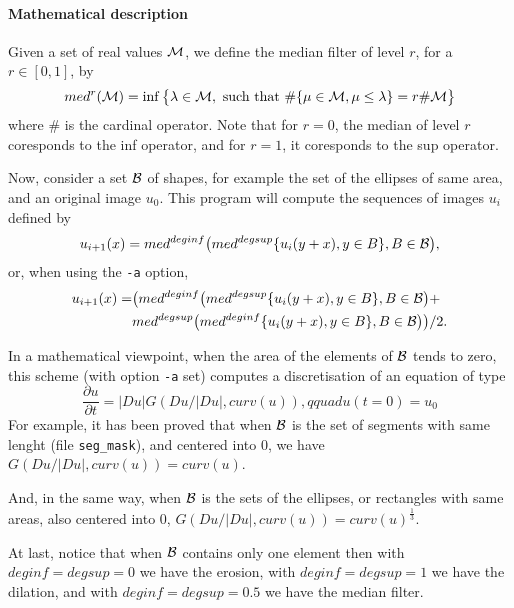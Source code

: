 
\paragraph{Mathematical description} \mbox{}

Given a set of real values ${\cal M}$, we define the median filter 
of level $r$, for a $r \in [0,1]$, by
$$ med^r({\cal M}) = \inf \big\{\lambda \in {\cal M}, 
\hbox{ such that }  \#\{ \mu \in {\cal M}, \mu \leq \lambda \} = r
 \#{\cal M} \big\}$$
where $\#$ is the cardinal operator.
Note that for $r=0$, the median of level $r$ coresponds to the inf operator, 
and for $r=1$, it coresponds to the sup operator.

Now, consider a set ${\cal B}$ of shapes, for example the set of the ellipses of same area, and an original image $u_0$.
This program will compute the sequences of images $u_i$ defined by
\[
u_{i+1}(x) = med^{deginf}\big( med^{degsup} \{u_{i}(y+x), y \in B \},
B \in {\cal B} \big),
\]
or, when using the \verb+-a+ option,
\begin{eqnarray*}
u_{i+1}(x) = & \big( med^{deginf}\big( med^{degsup} \{u_{i}(y+x), y \in B \},
B \in {\cal B} \big) + \\
& med^{degsup}\big( med^{deginf} \{u_{i}(y+x), y \in B \}, B \in {\cal B} \big) \big)
/2.
\end{eqnarray*}


In a mathematical viewpoint, when the area of the elements of ${\cal B}$ tends
to zero, this scheme (with option \verb+-a+ set) 
computes a discretisation of an equation of type
$$ \frac{\partial u}{\partial t} = |Du| G( Du/|Du|, curv(u)), qquad u(t=0)= u_0 $$
For example, it has been proved that when ${\cal B}$ is the set of
segments with same lenght (file \verb+seg_mask+), and centered into 0, 
we have $G( Du/|Du|, curv(u)) = curv(u)$.

And, in the same way, when ${\cal B}$ is the sets of the ellipses, or 
rectangles with same areas, also centered into 0, 
$G( Du/|Du|, curv(u)) = curv(u)^\frac{1}{3}$.

At last, notice that when ${\cal B}$ contains only one element then with $deginf = degsup = 0$ we have the erosion, with $deginf = degsup = 1$ we have the dilation, and with $deginf= degsup= 0.5$ we have the median filter.

